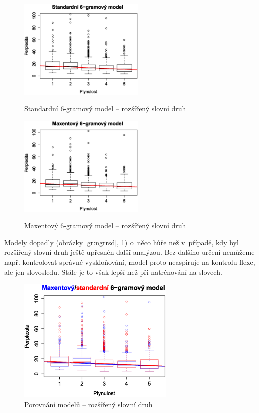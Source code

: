 \documentclass[12pt,a4paper]{report}
\begin{document}
\begin{figure}[!htb]
\begin{center}
  \centering\includegraphics[width=60mm]{./grafy/morf/ngram/rsd.svg.eps}
  \caption{Standardní 6-gramový model -- rozšířený slovní druh}\label{gr:ngrrsd}
\endminipage\quad
{}
  \centering\includegraphics[width=60mm]{./grafy/morf/maxent/rsd.svg.eps}
  \caption{Maxentový 6-gramový model -- rozšířený slovní druh}\label{gr:maxrsd}
\endminipage
\end{center}
\end{figure}


Modely dopadly (obrázky \ref{gr:ngrrsd}, \ref{gr:maxrsd}) o~něco hůře než v~případě, kdy byl rozšířený slovní druh ještě upřesněn další analýzou. Bez dalšího určení nemůžeme např. kontrolovat správné vyskloňování, model proto neaspiruje na kontrolu flexe, ale jen slovosledu. Stále je to však lepší než při natrénování na slovech.



\pagebreak


\begin{figure}[!htbp]
\begin{center}
	\centering
	\includegraphics[width=75mm]{./grafy/morf/porovnani/rsd.svg.eps}	
	\caption{Porovnání modelů -- rozšířený slovní druh}\label{gr:porrsd}
\endminipage
\end{center}
\end{figure}
\end{document}
